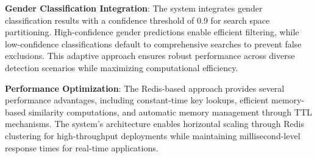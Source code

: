 \textbf{Gender Classification Integration}: The system integrates gender classification results with a confidence threshold of 0.9 for search space partitioning. High-confidence gender predictions enable efficient filtering, while low-confidence classifications default to comprehensive searches to prevent false exclusions. This adaptive approach ensures robust performance across diverse detection scenarios while maximizing computational efficiency.

\textbf{Performance Optimization}: The Redis-based approach provides several performance advantages, including constant-time key lookups, efficient memory-based similarity computations, and automatic memory management through TTL mechanisms. The system's architecture enables horizontal scaling through Redis clustering for high-throughput deployments while maintaining millisecond-level response times for real-time applications.